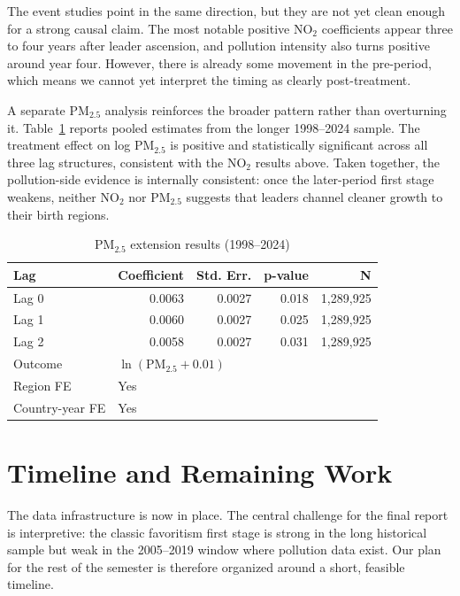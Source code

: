 \documentclass[11pt]{article}
\begin{document}
The event studies point in the same direction, but they are not yet clean enough for a strong causal claim. The most notable positive NO$_2$ coefficients appear three to four years after leader ascension, and pollution intensity also turns positive around year four. However, there is already some movement in the pre-period, which means we cannot yet interpret the timing as clearly post-treatment.

A separate PM$_{2.5}$ analysis reinforces the broader pattern rather than overturning it. Table~\ref{tab:pm25} reports pooled estimates from the longer 1998--2024 sample. The treatment effect on log PM$_{2.5}$ is positive and statistically significant across all three lag structures, consistent with the NO$_2$ results above. Taken together, the pollution-side evidence is internally consistent: once the later-period first stage weakens, neither NO$_2$ nor PM$_{2.5}$ suggests that leaders channel cleaner growth to their birth regions.

\begin{table}[h]
\centering
\caption{PM$_{2.5}$ extension results (1998--2024)}
\label{tab:pm25}
\small
\begin{tabular}{lrrrr}
\toprule
Lag & Coefficient & Std. Err. & p-value & N \\
\midrule
Lag 0 & 0.0063 & 0.0027 & 0.018 & 1{,}289{,}925 \\
Lag 1 & 0.0060 & 0.0027 & 0.025 & 1{,}289{,}925 \\
Lag 2 & 0.0058 & 0.0027 & 0.031 & 1{,}289{,}925 \\
\addlinespace
Outcome & \multicolumn{4}{l}{$\ln(\text{PM}_{2.5}+0.01)$} \\
Region FE & \multicolumn{4}{l}{Yes} \\
Country-year FE & \multicolumn{4}{l}{Yes} \\
\bottomrule
\end{tabular}
\end{table}

\section{Timeline and Remaining Work}
\noindent The data infrastructure is now in place. The central challenge for the final report is interpretive: the classic favoritism first stage is strong in the long historical sample but weak in the 2005--2019 window where pollution data exist. Our plan for the rest of the semester is therefore organized around a short, feasible timeline.
\end{document}
